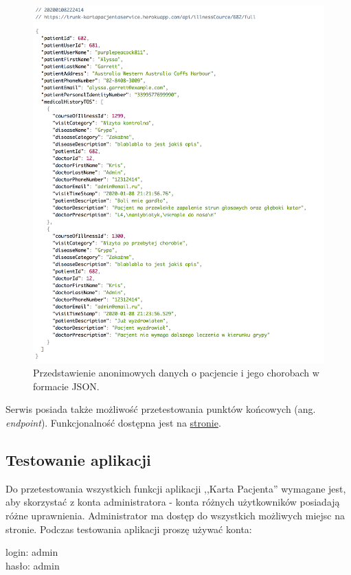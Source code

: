\begin{figure}[H]
\centering
\includegraphics[width=15cm]{pictures/service/07-json_normal}
\caption{Przedstawienie anonimowych danych o pacjencie i jego chorobach w formacie JSON.}
\end{figure}

Serwis posiada także możliwość przetestowania punktów końcowych (ang. \textit{endpoint}). Funkcjonalność dostępna jest na  \href{https://trunk-kartapacjentaservice.herokuapp.com/swagger-ui.html#/}{stronie}.

\subsection{Testowanie aplikacji}
Do przetestowania wszystkich funkcji aplikacji ,,Karta Pacjenta'' wymagane jest, aby skorzystać z konta administratora - konta różnych użytkowników posiadają różne uprawnienia. Administrator ma dostęp do wszystkich możliwych miejsc na stronie. Podczas testowania aplikacji proszę używać konta:\\
\begin{center}
\label{credentials}
login: admin\\
hasło: admin
\end{center}